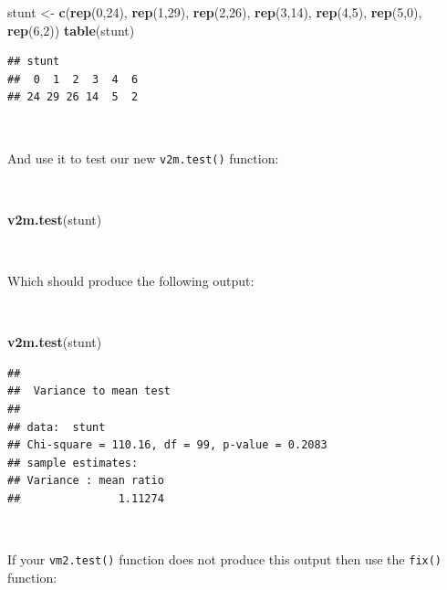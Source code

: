 \documentclass[12pt,a4paper]{book}
\newenvironment{Shaded}{\begin{snugshade}}{\end{snugshade}}
\newcommand{\KeywordTok}[1]{\textcolor[rgb]{0.13,0.29,0.53}{\textbf{#1}}}
\newcommand{\DecValTok}[1]{\textcolor[rgb]{0.00,0.00,0.81}{#1}}
\newcommand{\StringTok}[1]{\textcolor[rgb]{0.31,0.60,0.02}{#1}}
\newcommand{\NormalTok}[1]{#1}
\theoremstyle{definition}
\theoremstyle{definition}
\theoremstyle{definition}
\theoremstyle{remark}
\begin{document}
\begin{Shaded}
\begin{Highlighting}[]
\NormalTok{stunt <-}\StringTok{ }\KeywordTok{c}\NormalTok{(}\KeywordTok{rep}\NormalTok{(}\DecValTok{0}\NormalTok{,}\DecValTok{24}\NormalTok{), }\KeywordTok{rep}\NormalTok{(}\DecValTok{1}\NormalTok{,}\DecValTok{29}\NormalTok{), }\KeywordTok{rep}\NormalTok{(}\DecValTok{2}\NormalTok{,}\DecValTok{26}\NormalTok{), }\KeywordTok{rep}\NormalTok{(}\DecValTok{3}\NormalTok{,}\DecValTok{14}\NormalTok{), }\KeywordTok{rep}\NormalTok{(}\DecValTok{4}\NormalTok{,}\DecValTok{5}\NormalTok{),}
           \KeywordTok{rep}\NormalTok{(}\DecValTok{5}\NormalTok{,}\DecValTok{0}\NormalTok{), }\KeywordTok{rep}\NormalTok{(}\DecValTok{6}\NormalTok{,}\DecValTok{2}\NormalTok{))}
\KeywordTok{table}\NormalTok{(stunt)}
\end{Highlighting}
\end{Shaded}

\begin{verbatim}
## stunt
##  0  1  2  3  4  6 
## 24 29 26 14  5  2
\end{verbatim}

~

And use it to test our new \texttt{v2m.test()} function:

~

\begin{Shaded}
\begin{Highlighting}[]
\KeywordTok{v2m.test}\NormalTok{(stunt)}
\end{Highlighting}
\end{Shaded}

~

Which should produce the following output:

~

\begin{Shaded}
\begin{Highlighting}[]
\KeywordTok{v2m.test}\NormalTok{(stunt)}
\end{Highlighting}
\end{Shaded}

\begin{verbatim}
## 
##  Variance to mean test
## 
## data:  stunt
## Chi-square = 110.16, df = 99, p-value = 0.2083
## sample estimates:
## Variance : mean ratio 
##               1.11274
\end{verbatim}

~

If your \texttt{vm2.test()} function does not produce this output then
use the \texttt{fix()} function:
\end{document}
